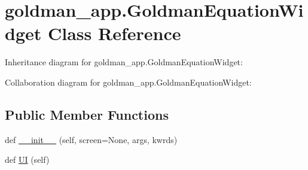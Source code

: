 \hypertarget{classgoldman__app_1_1GoldmanEquationWidget}{}\section{goldman\+\_\+app.\+Goldman\+Equation\+Widget Class Reference}
\label{classgoldman__app_1_1GoldmanEquationWidget}


Inheritance diagram for goldman\+\_\+app.\+Goldman\+Equation\+Widget\+:


Collaboration diagram for goldman\+\_\+app.\+Goldman\+Equation\+Widget\+:
\subsection*{Public Member Functions}
\begin{DoxyCompactItemize}
\item 
def \hyperlink{classgoldman__app_1_1GoldmanEquationWidget_aaec0bd4e16059c3660efe4984126a075}{\+\_\+\+\_\+init\+\_\+\+\_\+} (self, screen=None, args, kwrds)
\item 
def \hyperlink{classgoldman__app_1_1GoldmanEquationWidget_a0366838001fc830f1075d78ffd3c99c2}{UI} (self)
\end{DoxyCompactItemize}
